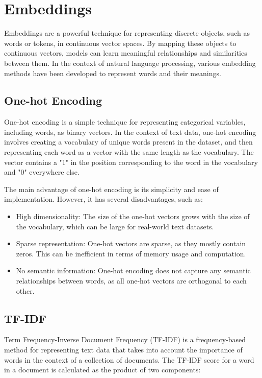 \documentclass[12pt]{article}
\begin{document}
\section{Embeddings}
Embeddings are a powerful technique for representing discrete objects, such as words or tokens, in continuous vector spaces. By mapping these objects to continuous vectors, models can learn meaningful relationships and similarities between them. In the context of natural language processing, various embedding methods have been developed to represent words and their meanings.

\subsection{One-hot Encoding}
One-hot encoding is a simple technique for representing categorical variables, including words, as binary vectors. In the context of text data, one-hot encoding involves creating a vocabulary of unique words present in the dataset, and then representing each word as a vector with the same length as the vocabulary. The vector contains a "1" in the position corresponding to the word in the vocabulary and "0" everywhere else.

The main advantage of one-hot encoding is its simplicity and ease of implementation. However, it has several disadvantages, such as:
\begin{itemize}
\item High dimensionality: The size of the one-hot vectors grows with the size of the vocabulary, which can be large for real-world text datasets.

\item Sparse representation: One-hot vectors are sparse, as they mostly contain zeros. This can be inefficient in terms of memory usage and computation.

\item No semantic information: One-hot encoding does not capture any semantic relationships between words, as all one-hot vectors are orthogonal to each other.
\end{itemize}

\subsection{TF-IDF}

Term Frequency-Inverse Document Frequency (TF-IDF) is a frequency-based method for representing text data that takes into account the importance of words in the context of a collection of documents. The TF-IDF score for a word in a document is calculated as the product of two components:
\end{document}
